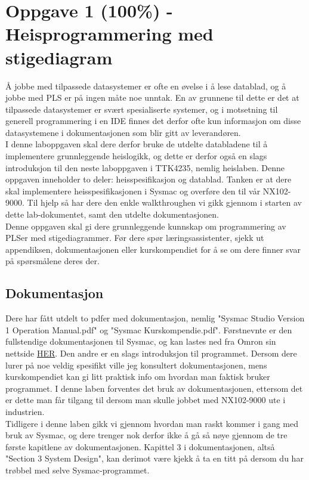 \section{Oppgave 1 (100\%) - Heisprogrammering med stigediagram}\label{sec:3-oppgave1}
Å jobbe med tilpassede datasystemer er ofte en øvelse i å lese datablad, og å jobbe med PLS er på ingen måte noe unntak. En av grunnene til dette er det at tilpassede datasystemer er svært spesialiserte systemer, og i motsetning til generell programmering i en IDE finnes det derfor ofte kun informasjon om disse datasystemene i dokumentasjonen som blir gitt av leverandøren.\\

I denne laboppgaven skal dere derfor bruke de utdelte databladene til å implementere grunnleggende heislogikk, og dette er derfor også en slags introduksjon til den neste laboppgaven i TTK4235, nemlig heislaben. Denne oppgaven inneholder to deler: heisspesifikasjon og datablad. Tanken er at dere skal implementere heisspesifikasjonen i Sysmac og overføre den til vår NX102-9000. Til hjelp så har dere den enkle walkthroughen vi gikk gjennom i starten av dette lab-dokumentet, samt den utdelte dokumentasjonen.\\

Denne oppgaven skal gi dere grunnleggende kunnskap om programmering av PLSer med stigediagrammer. Før dere spør læringsassistenter, sjekk ut appendiksen, dokumentasjonen eller kurskompendiet for å se om dere finner svar på spørsmålene deres der.

\subsection{Dokumentasjon}
Dere har fått utdelt to pdfer med dokumentasjon, nemlig "Sysmac Studio Version 1 Operation Manual.pdf" og "Sysmac Kurskompendie.pdf". Førstnevnte er den fullstendige dokumentasjonen til Sysmac, og kan lastes ned fra Omron sin nettside \href{https://assets.omron.eu/downloads/manual/en/v5/w504_sysmac_studio_operation_manual_en.pdf}{HER}. Den andre er en slags introduksjon til programmet. Dersom dere lurer på noe veldig spesifikt ville jeg konsultert dokumentasjonen, mens kurskompendiet kan gi litt praktisk info om hvordan man faktisk bruker programmet. I denne laben forventes det bruk av dokumentasjonen, ettersom det er dette man får tilgang til dersom man skulle jobbet med NX102-9000 ute i industrien.\\

Tidligere i denne laben gikk vi gjennom hvordan man raskt kommer i gang med bruk av Sysmac, og dere trenger nok derfor ikke å gå så nøye gjennom de tre første kapitlene av dokumentasjonen. Kapittel 3 i dokumentasjonen, altså "Section 3 System Design", kan derimot være kjekk å ta en titt på dersom du har trøbbel med selve Sysmac-programmet.\\

